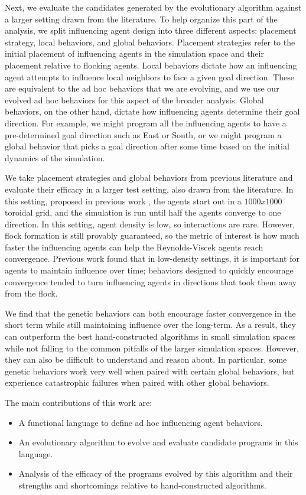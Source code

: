 Next, we evaluate the candidates generated by the evolutionary algorithm against
a larger setting drawn from the literature.
To help organize this part of the analysis, we split influencing agent design
into three different aspects: placement strategy, local behaviors, and global
behaviors.
Placement strategies refer to the initial placement of influencing agents in
the simulation space and their placement relative to flocking agents.
Local behaviors dictate how an influencing agent attempts to influence local
neighbors to face a given goal direction.
These are equivalent to the ad hoc behaviors that we are evolving, and we use
our evolved ad hoc behaviors for this aspect of the broader analysis.
Global behaviors, on the other hand, dictate how influencing agents determine
their goal direction.
For example, we might program all the influencing agents to have a
pre-determined goal direction such as East or South, or we might program a
global behavior that picks a goal direction after some time based on the
initial dynamics of the simulation.

We take placement strategies and global behaviors from previous literature and
evaluate their efficacy in a larger test setting, also drawn from the
literature.
In this setting, proposed in previous work \cite{Fu2017}, the agents start out
in a $1000x1000$ toroidal grid, and the simulation is run until half the agents
converge to one direction.
In this setting, agent density is low, so interactions are rare.
However, flock formation is still provably guaranteed, so the metric of interest
is how much faster the influencing agents can help the Reynolds-Viscek agents
reach convergence.
Previous work found that in low-density settings, it is important for agents to
maintain influence over time; behaviors designed to quickly encourage
convergence tended to turn influencing agents in directions that took them away
from the flock.

We find that the genetic behaviors can both encourage faster convergence in the
short term while still maintaining influence over the long-term.
As a result, they can outperform the best hand-constructed algorithms in small
simulation spaces while not falling to the common pitfalls of the larger
simulation spaces.
However, they can also be difficult to understand and reason about.
In particular, some genetic behaviors work very well when paired with certain
global behaviors, but experience catastrophic failures when paired with other
global behaviors.

The main contributions of this work are:
\begin{itemize}
    \item A functional language to define ad hoc influencing agent behaviors.
    \item An evolutionary algorithm to evolve and evaluate candidate programs in
    this language.
    \item Analysis of the efficacy of the programs evolved by this algorithm and
    their strengths and shortcomings relative to hand-constructed algorithms.
\end{itemize}


